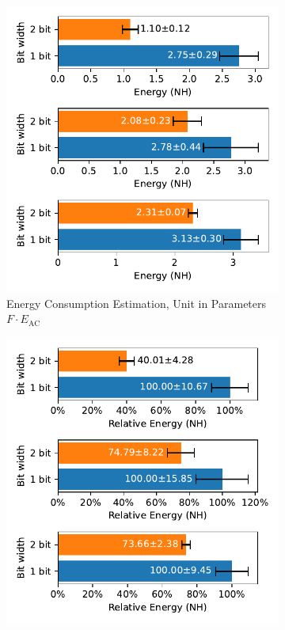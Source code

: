         \begin{figure}[H]
            \centering
            \begin{subfigure}[H]{0.495\textwidth}
                \includegraphics[width=\textwidth]{../timesteps/FashionMNIST/plots/fashionmnist_test_energy_nh.pdf}
                \caption{Energy Consumption Estimation, Unit in Parameters $F\cdot E_{\text{AC}}$}
            \end{subfigure}
            \hfill
            \begin{subfigure}[H]{0.495\textwidth}
                \includegraphics[width=\textwidth]{../timesteps/FashionMNIST/plots/fashionmnist_test_relative_energy_nh.pdf}

\end{subfigure}
\end{figure}
